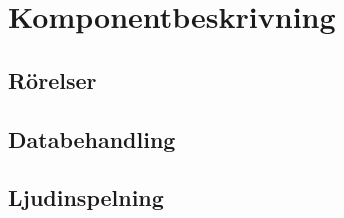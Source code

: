 \section{Komponentbeskrivning}

\subsection{Rörelser}


\subsection{Databehandling}


\subsection{Ljudinspelning}
